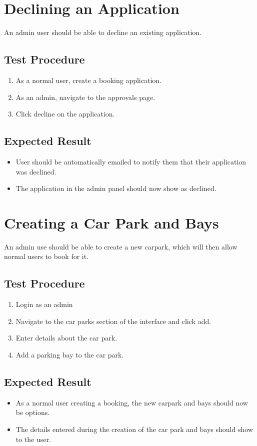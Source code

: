 \documentclass[a4paper, draft]{article}
\begin{document}
\section{Declining an Application}
An admin user should be able to decline an existing application.

\subsection{Test Procedure}
\begin{enumerate}
    \item As a normal user, create a booking application.
    \item As an admin, navigate to the approvals page.
    \item Click decline on the application.
\end{enumerate}

\subsection{Expected Result}
\begin{itemize}
    \item User should be automatically emailed to notify them that their application was declined.
    \item The application in the admin panel should now show as declined.
\end{itemize}

\newpage
\section{Creating a Car Park and Bays}
An admin use should be able to create a new carpark, which will then allow normal users to book for it.

\subsection{Test Procedure}
\begin{enumerate}
    \item Login as an admin
    \item Navigate to the car parks section of the interface and click add.
    \item Enter details about the car park.
    \item Add a parking bay to the car park.
\end{enumerate}

\subsection{Expected Result}
\begin{itemize}
    \item As a normal user creating a booking, the new carpark and bays should now be options.
    \item The details entered during the creation of the car park and bays should show to the user.
\end{itemize}
\end{document}
